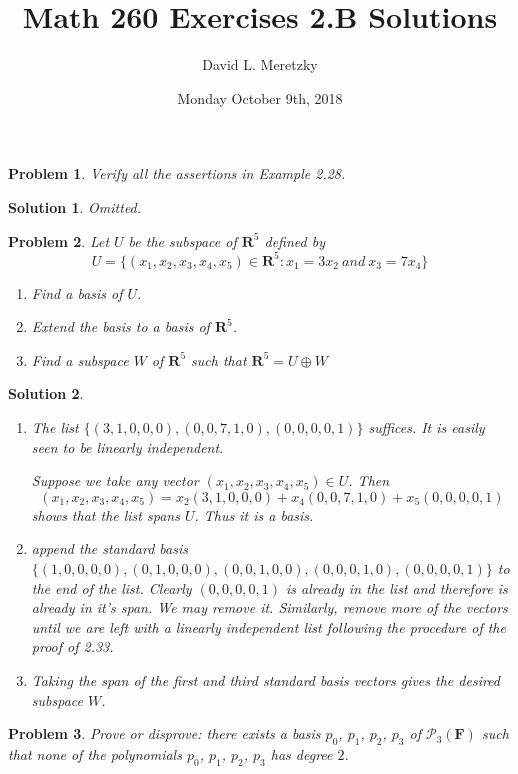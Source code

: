 \documentclass{article}
\title{ \vspace{-10ex} %
Math 260 Exercises 2.B Solutions
}
\author{David L. Meretzky
}
\date{%
Monday October 9th, 2018
}
\theoremstyle{problemstyle}
\newtheorem{problem}{Problem}
\theoremstyle{problemstyle}
\newtheorem{solution}{Solution}
\begin{document}
\maketitle

\begin{problem}
Verify all the assertions in Example 2.28.
\end{problem}

\begin{solution}
Omitted. 
\end{solution}

\begin{problem}
Let $U$ be the subspace of $\textbf{R}^5$ defined by $$U = \{(x_1,x_2,x_3,x_4,x_5) \in \textbf{R}^5 : x_1 = 3x_2 \ and \  x_3 = 7x_4 \}$$
\begin{enumerate}
\item Find a basis of $U$.
\item Extend the basis to a basis of $\textbf{R}^5$.
\item Find a subspace $W$ of $\textbf{R}^5$ such that $\textbf{R}^5 = U \oplus W$
\end{enumerate}
\end{problem}

\begin{solution}
\begin{enumerate}
\item The list $\{(3,1,0,0,0),(0,0,7,1,0),(0,0,0,0,1)\}$ suffices. It is easily seen to be linearly independent.

Suppose we take any vector $(x_1,x_2,x_3,x_4,x_5) \in U$. Then $$(x_1,x_2,x_3,x_4,x_5) = x_2(3,1,0,0,0) + x_4(0,0,7,1,0) + x_5(0,0,0,0,1)$$ shows that the list spans $U$. Thus it is a basis. 
\item append the standard basis $\{(1,0,0,0,0),(0,1,0,0,0),(0,0,1,0,0),(0,0,0,1,0),(0,0,0,0,1)\}$ to the end of the list. Clearly $(0,0,0,0,1)$ is already in the list and therefore is already in it's span. We may remove it. Similarly, remove more of the vectors until we are left with a linearly independent list following the procedure of the proof of 2.33. 
\item Taking the span of the first and third standard basis vectors gives the desired subspace $W$. 
\end{enumerate}
\end{solution}

\begin{problem}
Prove or disprove: there exists a basis $p_0$, $p_1$, $p_2$, $p_3$ of $\mathcal{P}_3(\textbf{F})$ such that none of the polynomials $p_0$, $p_1$, $p_2$, $p_3$ has degree $2$. 
\end{problem}
\end{document}

